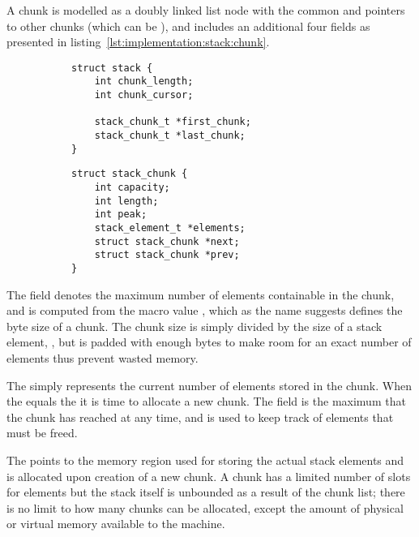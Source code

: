 A chunk is modelled as a doubly linked list node with the common  and
 pointers to other chunks (which can be ), and includes an
additional four fields as presented in
listing~\ref{lst:implementation:stack:chunk}.
\begin{figure}[h]
  \centering
  \begin{subfigure}[a]{.5\textwidth}
    \begin{lstlisting}[language={[ANSI]C},%
  caption={Structure defining the stack},%
  label={lst:implementation:stack:chunk}]
struct stack {
    int chunk_length;
    int chunk_cursor;

    stack_chunk_t *first_chunk;
    stack_chunk_t *last_chunk;
}
    \end{lstlisting}
  \end{subfigure}
  \begin{subfigure}[a]{.5\textwidth}
    \begin{lstlisting}[language={[ANSI]C},%
  caption={Structure defining a chunk of the stack},%
  label={lst:implementation:stack:chunk}]
struct stack_chunk {
    int capacity;
    int length;
    int peak;
    stack_element_t *elements;
    struct stack_chunk *next;
    struct stack_chunk *prev;
}
    \end{lstlisting}
  \end{subfigure}
\end{figure}

The  field denotes the maximum number of elements containable in
the chunk, and is computed from the macro value , which
as the name suggests defines the byte size of a chunk. The chunk size is simply
divided by the size of a stack element, , but is padded
with enough bytes to make room for an exact number of elements thus prevent
wasted memory.

The  simply represents the current number of elements stored in the
chunk. When the  equals the  it is time to allocate
a new chunk. The  field is the maximum  that the chunk
has reached at any time, and is used to keep track of elements that must be
freed.

The  points to the memory region used for storing the actual
stack elements and is allocated upon creation of a new chunk. A chunk has a
limited number of slots for elements but the stack itself is unbounded as a
result of the chunk list; there is no limit to how many chunks can be allocated,
except the amount of physical or virtual memory available to the machine.

